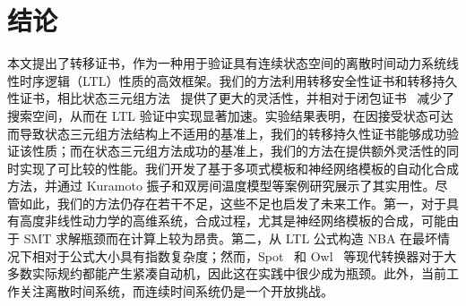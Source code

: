 ﻿\section{结论}
\label{sec:conclusion}

本文提出了转移证书，作为一种用于验证具有连续状态空间的离散时间动力系统线性时序逻辑（LTL）性质的高效框架。我们的方法利用转移安全性证书和转移持久性证书，相比状态三元组方法~\cite{wongpiromsarn2015automata} 提供了更大的灵活性，并相对于闭包证书~\cite{murali2024closure} 减少了搜索空间，从而在 LTL 验证中实现显著加速。实验结果表明，在因接受状态可达而导致状态三元组方法结构上不适用的基准上，我们的转移持久性证书能够成功验证该性质；而在状态三元组方法成功的基准上，我们的方法在提供额外灵活性的同时实现了可比较的性能。我们开发了基于多项式模板和神经网络模板的自动化合成方法，并通过 Kuramoto 振子和双房间温度模型等案例研究展示了其实用性。尽管如此，我们的方法仍存在若干不足，这些不足也启发了未来工作。第一，对于具有高度非线性动力学的高维系统，合成过程，尤其是神经网络模板的合成，可能由于 SMT 求解瓶颈而在计算上较为昂贵。第二，从 LTL 公式构造 NBA 在最坏情况下相对于公式大小具有指数复杂度；然而，Spot~\cite{spot} 和 Owl~\cite{owl} 等现代转换器对于大多数实际规约都能产生紧凑自动机，因此这在实践中很少成为瓶颈。此外，当前工作关注离散时间系统，而连续时间系统仍是一个开放挑战。
